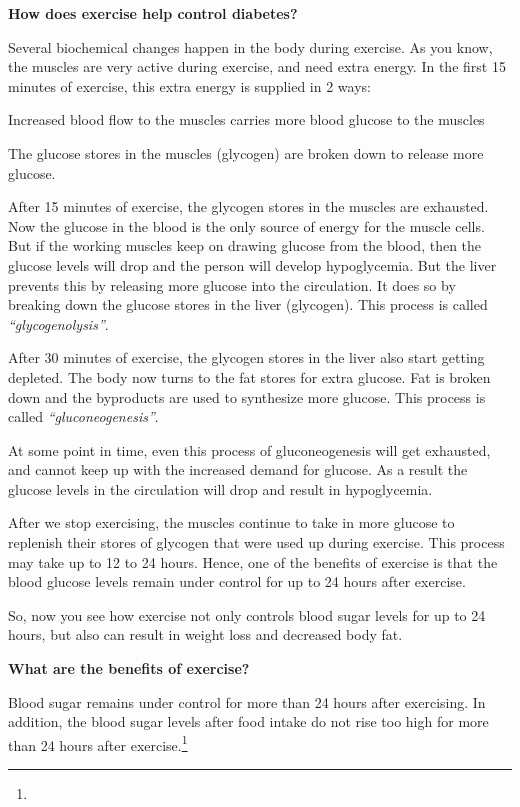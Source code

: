 
\textbf{How does exercise help control diabetes?}

Several biochemical changes happen in the body during exercise. As you know, the muscles are very active during exercise, and need extra energy. In the first 15 minutes of exercise, this extra energy is supplied in 2 ways:

\item Increased blood flow to the muscles carries more blood glucose to the muscles

 \item The glucose stores in the muscles (glycogen) are broken down to release more glucose.

After 15 minutes of exercise, the glycogen stores in the muscles are exhausted. Now the glucose in the blood is the only source of energy for the muscle cells. But if the working muscles keep on drawing glucose from the blood, then the glucose levels will drop and the person will develop hypoglycemia. But the liver prevents this by releasing more glucose into the circulation. It does so by breaking down the glucose stores in the liver (glycogen). This process is called \textit{“glycogenolysis”}.

After 30 minutes of exercise, the glycogen stores in the liver also start getting depleted. The body now turns to the fat stores for extra glucose. Fat is broken down and the byproducts are used to synthesize more glucose. This process is called \textit{“gluconeogenesis”}.

At some point in time, even this process of gluconeogenesis will get exhausted, and cannot keep up with the increased demand for glucose. As a result the glucose levels in the circulation will drop and result in hypoglycemia.

After we stop exercising, the muscles continue to take in more glucose to replenish their stores of glycogen that were used up during exercise. This process may take up to 12 to 24 hours. Hence, one of the benefits of exercise is that the blood glucose levels remain under control for up to 24 hours after exercise.

So, now you see how exercise not only controls blood sugar levels for up to 24 hours, but also can result in weight loss and decreased body fat.

\textbf{What are the benefits of exercise?}

Blood sugar remains under control for more than 24 hours after exercising. In addition, the blood sugar levels after food intake do not rise too high for more than 24 hours after exercise.\footnote{}

